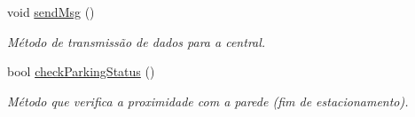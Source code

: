 \begin{DoxyCompactItemize}
\mbox{\label{parking-solution_8ino_afb16af85febe65a8f968f271378aba74}} 
void \mbox{\hyperlink{parking-solution_8ino_afb16af85febe65a8f968f271378aba74}{send\+Msg}} ()
\begin{DoxyCompactList}\small\item\em Método de transmissão de dados para a central. \end{DoxyCompactList}\item 
bool \mbox{\hyperlink{parking-solution_8ino_a28085526e415309b308fea6fc73d744f}{check\+Parking\+Status}} ()
\begin{DoxyCompactList}\small\item\em Método que verifica a proximidade com a parede (fim de estacionamento). \end{DoxyCompactList}\end{DoxyCompactItemize}
